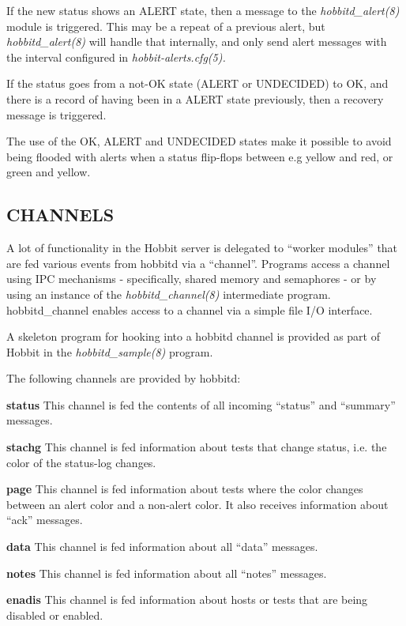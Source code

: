   If the new status shows an ALERT state, then a message to the \emph{hobbitd\_alert(8) }
 module is triggered. This may be a repeat of a previous alert, but \emph{hobbitd\_alert(8)}
 will handle that internally, and only send alert messages with the interval configured in \emph{hobbit-alerts.cfg(5).}



  If the status goes from a not-OK state (ALERT or UNDECIDED) to OK, and there is a record of having been in a ALERT state previously, then a recovery message is triggered. 


  The use of the OK, ALERT and UNDECIDED states make it possible to avoid being flooded with alerts when a status flip-flops between e.g yellow and red, or green and yellow. 


 
\subsection{CHANNELS}
 A lot of functionality in the Hobbit server is delegated to ``worker modules'' that are fed various events from hobbitd via a ``channel''. Programs access a channel using IPC mechanisms - specifically, shared memory and semaphores - or by using an instance of the \emph{hobbitd\_channel(8)}
 intermediate program. hobbitd\_channel enables access to a channel via a simple file I/O interface. 

  A skeleton program for hooking into a hobbitd channel is provided as part of Hobbit in the \emph{hobbitd\_sample(8)}
 program. 


  The following channels are provided by hobbitd: 


 \textbf{status}
 This channel is fed the contents of all incoming ``status'' and ``summary'' messages. 


 \textbf{stachg}
 This channel is fed information about tests that change status, i.e. the color of the status-log changes. 


 \textbf{page}
 This channel is fed information about tests where the color changes between an alert color and a non-alert color. It also receives information about ``ack'' messages. 


 \textbf{data}
 This channel is fed information about all ``data'' messages. 


 \textbf{notes}
 This channel is fed information about all ``notes'' messages. 


 \textbf{enadis}
 This channel is fed information about hosts or tests that are being disabled or enabled. 



